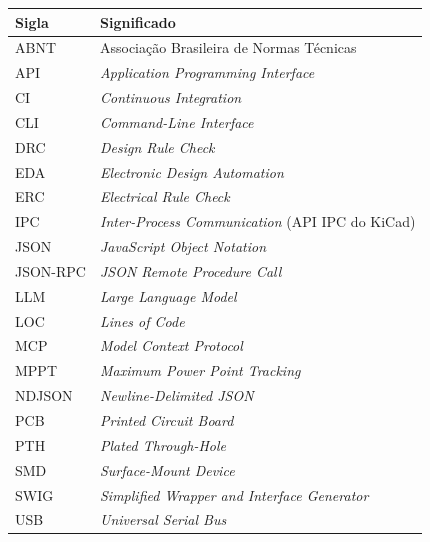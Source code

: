 \begin{tabular}{@{}p{2.6cm}p{11.4cm}@{}}
\toprule
\textbf{Sigla} & \textbf{Significado} \\
\midrule
ABNT & Associação Brasileira de Normas Técnicas \\
API & \emph{Application Programming Interface} \\
CI & \emph{Continuous Integration} \\
CLI & \emph{Command-Line Interface} \\
DRC & \emph{Design Rule Check} \\
EDA & \emph{Electronic Design Automation} \\
ERC & \emph{Electrical Rule Check} \\
IPC & \emph{Inter-Process Communication} (API IPC do KiCad) \\
JSON & \emph{JavaScript Object Notation} \\
JSON-RPC & \emph{JSON Remote Procedure Call} \\
LLM & \emph{Large Language Model} \\
LOC & \emph{Lines of Code} \\
MCP & \emph{Model Context Protocol} \\
MPPT & \emph{Maximum Power Point Tracking} \\
NDJSON & \emph{Newline-Delimited JSON} \\
PCB & \emph{Printed Circuit Board} \\
PTH & \emph{Plated Through-Hole} \\
SMD & \emph{Surface-Mount Device} \\
SWIG & \emph{Simplified Wrapper and Interface Generator} \\
USB & \emph{Universal Serial Bus} \\
\bottomrule
\end{tabular}
